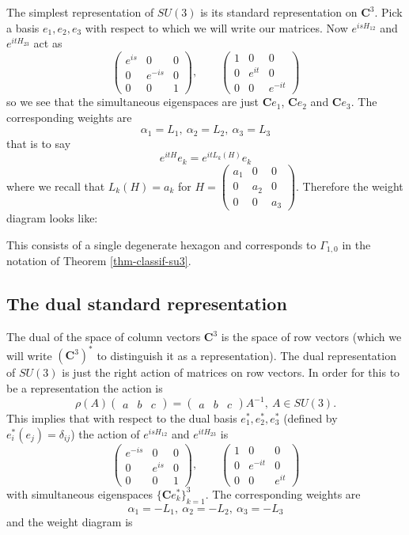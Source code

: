 \documentclass[12pt]{article}
\newcommand{\CC}{\mathbf{C}}
\theoremstyle{definition}
\theoremstyle{check}
\theoremstyle{remark}
\theoremstyle{TheoremNum}
\begin{document}
The simplest representation of $SU(3)$ is its standard representation on $\CC^3$. Pick a basis $e_1,e_2,e_3$ with respect to which we will write our matrices. Now $e^{isH_{12}}$ and $e^{itH_{23}}$ act as
\[\left(\begin{array}{ccc}e^{is} & 0 & 0\\
0 & e^{-is} & 0\\
0 & 0 & 1\end{array}\right),\qquad\left(\begin{array}{ccc}1 & 0 & 0\\
0 & e^{it} & 0\\
0 & 0 & e^{-it}\end{array}\right)\]
so we see that the simultaneous eigenspaces are just $\CC e_1$, $\CC e_2$ and $\CC e_3$. The corresponding weights are
\[\alpha_1=L_1,\ \alpha_2=L_2,\ \alpha_3=L_3\]
that is to say
\[e^{itH}e_k=e^{itL_k(H)}e_k\]
where we recall that $L_k(H)=a_k$ for $H=\left(\begin{array}{ccc}a_1 & 0 & 0\\ 0 & a_2 & 0\\ 0 & 0 & a_3\end{array}\right)$. Therefore the weight diagram looks like:

\slthreestd

This consists of a single degenerate hexagon and corresponds to $\Gamma_{1,0}$ in the notation of Theorem \ref{thm-classif-su3}.

\subsection{The dual standard representation}

The dual of the space of column vectors $\CC^3$ is the space of row vectors (which we will write $(\CC^3)^*$ to distinguish it as a representation). The dual representation of $SU(3)$ is just the right action of matrices on row vectors. In order for this to be a representation the action is
\[\rho(A)\left(\begin{array}{ccc}a & b &c\end{array}\right)=\left(\begin{array}{ccc}a & b &c\end{array}\right)A^{-1},\ A\in SU(3).\]
This implies that with respect to the dual basis $e_1^*,e_2^*,e_3^*$ (defined by $e_i^*(e_j)=\delta_{ij}$) the action of $e^{isH_{12}}$ and $e^{itH_{23}}$ is
\[\left(\begin{array}{ccc}e^{-is} & 0 & 0\\
0 & e^{is} & 0\\
0 & 0 & 1\end{array}\right),\qquad\left(\begin{array}{ccc}1 & 0 & 0\\
0 & e^{-it} & 0\\
0 & 0 & e^{it}\end{array}\right)\]
with simultaneous eigenspaces $\{\CC e_k^*\}_{k=1}^3$. The corresponding weights are
\[\alpha_1=-L_1,\ \alpha_2=-L_2,\ \alpha_3=-L_3\]
and the weight diagram is
\end{document}
